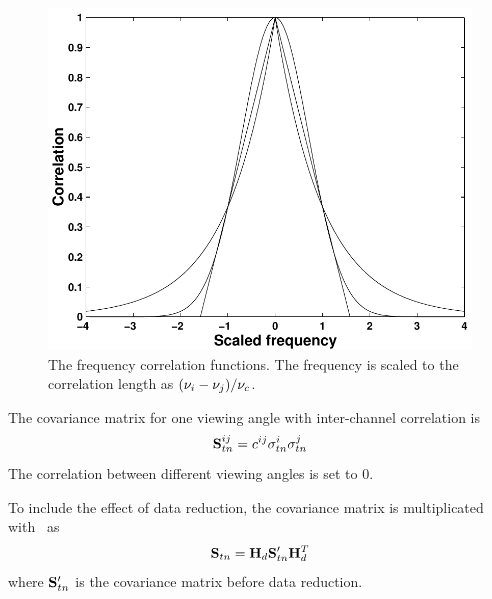  \begin{figure}
  \begin{center}
   \begin{minipage}[c]{0.65\textwidth}
    \centering
    \includegraphics*[width=0.99\hsize]{Figs/fig_corrfuns}
   \end{minipage}%
   \hspace{0.03\textwidth}%
   \begin{minipage}[c]{0.30\textwidth}
    \centering
    \caption{The frequency correlation functions. The frequency is scaled to
             the correlation length as $(\nu_i-\nu_j)/\nu_c$.}
    \label{fig:measerr:cfuns}
   \end{minipage}
  \end{center}
 \end{figure}           
 
 The covariance matrix for one viewing angle with inter-channel
 correlation is
 \begin{equation}
   \mathbf{S}_{tn}^{ij} = c^{ij} \sigma_{tn}^i \sigma_{tn}^j
  \label{eq:measerr:Stn}
 \end{equation}
 The correlation between different viewing angles is set to 0.

 To include the effect of data reduction, the covariance matrix is
 multiplicated with \Hd\ as
 \begin{equation}
   \mathbf{S}_{tn} = \mathbf{H}_d \mathbf{S}_{tn}' \mathbf{H}_d^T 
   \label{eq:measerr:HSH}
 \end{equation}
 where $\mathbf{S}_{tn}'$ is the covariance matrix before data reduction.


